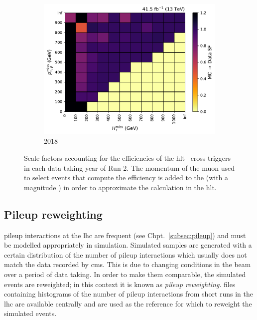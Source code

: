\begin{figure}[htbp]
    \begin{subfigure}[b]{0.48\textwidth}
        \includegraphics[width=\textwidth]{figures/trigger_efficiencies/2017/SFs.pdf}
        \caption{2018}
    \end{subfigure}
    \caption[Scale factors accounting for the efficiencies of the HLT \ptmiss--\mht cross triggers in each data taking year of Run-2]{Scale factors accounting for the efficiencies of the \acrshort{hlt} \ptmiss--\mht cross triggers in each data taking year of Run-2. The momentum of the muon used to select events that compute the efficiency is added to the \ptvecmiss (with a magnitude \ptmissNoMu) in order to approximate the calculation in the \acrlong{hlt}.}
    \label{fig:htoinv_trig_effs}
\end{figure}




\subsection{Pileup reweighting}
\label{subsec:pu_reweighting}

\Gls{pileup} interactions at the \acrshort{lhc} are frequent (see Chpt.~\ref{subsec:pileup}) and must be modelled appropriately in simulation. Simulated samples are generated with a certain distribution of the number of \gls{pileup} interactions which usually does not match the data recorded by \acrshort{cms}. This is due to changing conditions in the beam over a period of data taking. In order to make them comparable, the simulated events are reweighted; in this context it is known as \emph{\gls{pileup} reweighting}. \ROOT files containing histograms of the number of \gls{pileup} interactions from short runs in the \acrshort{lhc} are available centrally and are used as the reference for which to reweight the simulated events.

